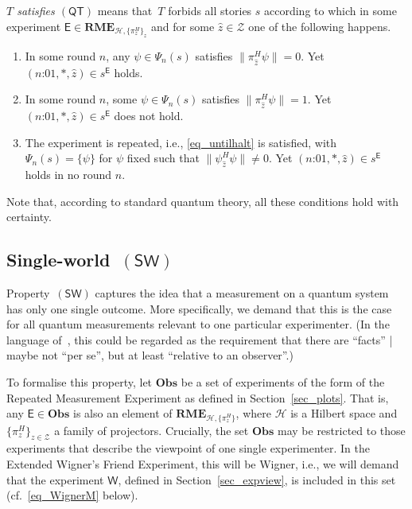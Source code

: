 \documentclass{article}
\theoremstyle{plain}
\theoremstyle{definition}
\newcommand*{\cH}{\mathcal{H}}
\newcommand*{\cZ}{\mathcal{Z}}
\newcommand*{\Exp}{\mathsf{E}}
\newcommand*{\Wigner}{\mathsf{W}}
\newcommand*{\BOE}{\mathbf{Obs}}
\newcommand*{\RME}{\mathbf{RME}}
\newcommand*{\QT}{\mathsf{(QT)}}
\newcommand*{\SW}{\mathsf{(SW)}}
\begin{document}
\begin{shaded}
  \noindent \emph{$T$ satisfies $\QT$} means that~$T$ forbids all stories $s$ according to which in some experiment $\Exp \in \RME_{\cH, \{\pi^H_z\}_z}$ and for some $\hat{z} \in \cZ$ one of the following happens. \nobreak
      \begin{enumerate}[label=(\emph{\alph*}),itemindent=0cm,labelsep=0.4em,leftmargin=1.7em]
     \item  In some  round $n$, any $\psi \in \Psi_n(s)$ satisfies $\|\pi^H_{\hat{z}} \psi\| = 0$. Yet $(\text{$n$:01}, *, \hat{z}) \in s^{\Exp}$ holds.  \label{it_QMa}
     \item In some round $n$, some $\psi \in \Psi_n(s)$  satisfies $\|\pi^H_{\hat{z}} \psi\| = 1$. Yet $(\text{$n$:01}, *, \hat{z}) \in s^{\Exp}$ does not hold.  \label{it_QMb}
      \item The experiment is repeated, i.e., \eqref{eq_untilhalt} is satisfied, with $\Psi_n(s) = \{\psi\}$ for $\psi$ fixed such that  $\|\psi^H_{\hat{z}} \psi\| \neq 0$.  Yet $(\text{$n$:01}, *, \hat{z}) \in s^{\Exp}$ holds in no round $n$. \label{it_QMc}
           \end{enumerate}
    \vspace{-1.7ex}
    \end{shaded}
    
 Note that, according to standard quantum theory, all these conditions hold with certainty. 
   

\subsection{Single-world~$\SW$}

Property~$\SW$ captures the idea that a measurement on a quantum system has only one single outcome. More specifically, we demand that this is the case for all quantum measurements relevant to one particular experimenter. (In the language of~\cite{Brukner15}, this could be regarded as the requirement that there are ``facts'' | maybe not ``per se'', but at least ``relative to an observer''.) 

To formalise this property, let $\BOE$ be a set of experiments of the form of the Repeated Measurement Experiment as defined in Section~\ref{sec_plots}. That is, any $\Exp \in \BOE$ is also an element of $\RME_{\cH, \{\pi^H_z\}}$, where $\cH$  is a Hilbert space and $\{\pi^H_z\}_{z \in \cZ}$ a family of projectors. Crucially, the set $\BOE$ may be restricted to those experiments that describe the viewpoint of one single experimenter. In the Extended Wigner's Friend Experiment, this will be Wigner, i.e., we will demand that the experiment $\Wigner$, defined in Section~\ref{sec_expview}, is included in this set (cf.\ \eqref{eq_WignerM} below). 
\end{document}
